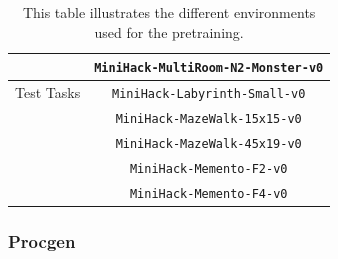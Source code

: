 \documentclass[]{fairmeta}
\begin{document}
\begin{table}[!ht]
\begin{tabular}{c c }
        &\texttt{MiniHack-MultiRoom-N2-Monster-v0} \\
\hline
Test Tasks & \texttt{MiniHack-Labyrinth-Small-v0} \\
            & \texttt{MiniHack-MazeWalk-15x15-v0} \\
            & \texttt{MiniHack-MazeWalk-45x19-v0} \\
            & \texttt{MiniHack-Memento-F2-v0} \\
            & \texttt{MiniHack-Memento-F4-v0} \\
\hline
\end{tabular}
\caption{ This table illustrates the different environments used for the pretraining. }
\label{tab:minihack_env_details}
\end{table}
\subsubsection{Procgen}
\end{document}
